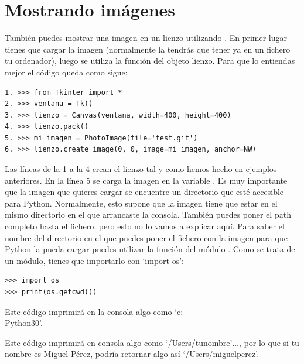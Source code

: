 \section{Mostrando imágenes}

También puedes mostrar una imagen en un lienzo utilizando . En primer lugar tienes que cargar la imagen (normalmente la tendrás que tener ya en un fichero tu ordenador), luego se utiliza la función  del objeto lienzo. Para que lo entiendas mejor el código queda como sigue:

\begin{listing}
\begin{verbatim}
1. >>> from Tkinter import *
2. >>> ventana = Tk()
3. >>> lienzo = Canvas(ventana, width=400, height=400)
4. >>> lienzo.pack()
5. >>> mi_imagen = PhotoImage(file='test.gif')
6. >>> lienzo.create_image(0, 0, image=mi_imagen, anchor=NW)
\end{verbatim}
\end{listing}

Las líneas de la 1 a la 4 crean el lienzo tal y como hemos hecho en ejemplos anteriores. En la línea 5 se carga la imagen en la variable .  Es muy importante que la imagen que quieres cargar se encuentre un directorio que esté accesible para Python. Normalmente, esto supone que la imagen tiene que estar en el mismo directorio en el que arrancaste la consola. También puedes poner el path completo hasta el fichero, pero esto no lo vamos a explicar aquí.  Para saber el nombre del directorio en el que puedes poner el fichero con la imagen para que Python la pueda cargar puedes utilizar la función  del módulo . Como se trata de un módulo, tienes que importarlo con `import os':

\begin{listing}
\begin{verbatim}
>>> import os
>>> print(os.getcwd())
\end{verbatim}
\end{listing}

\begin{WINDOWS}
Este código imprimirá en la consola algo como `c:\\Python30'.
\end{WINDOWS}

\begin{MAC}
Este código imprimirá en consola algo como `/Users/tunombre'$\ldots$, por lo que si tu nombre es Miguel Pérez,  podría retornar algo así `/Users/miguelperez'.
\end{MAC}

